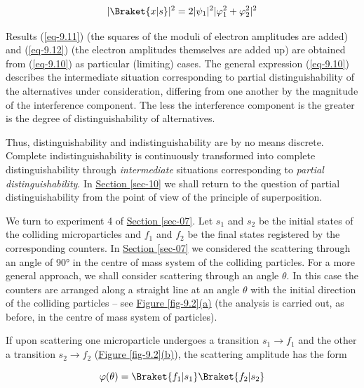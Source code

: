 \documentclass[a4paper,sfsidenotes,colorlinks=true]{tufte-book}
\numberwithin{equation}{section}
\numberwithin{figure}{section}
\begin{document}
\begin{equation}%
|\Braket{x|s}|^{2} = 2 |\psi_{1}|^{2} |\varphi_{1}^{2} + \varphi_{2}^{2}|^{2}
\label{eq-9.12}
\end{equation}

Results (\ref{eq-9.11}) (the squares of the moduli of electron amplitudes are added) and (\ref{eq-9.12}) (the electron amplitudes themselves are added up) are obtained from (\ref{eq-9.10}) as particular (limiting) cases. The general expression (\ref{eq-9.10}) describes the intermediate situation corresponding to partial distinguishability of the alternatives under consideration, differing from one another by the magnitude of the interference component. The less the interference component is the greater is the degree of distinguishability of alternatives.

Thus, distinguishability and indistinguishability are by no means
discrete. Complete indistinguishability is continuously transformed
into complete distinguishability through \emph{intermediate}
situations corresponding to \emph{partial distinguishability}. In
\hyperref[sec-10]{Section \ref{sec-10}} we shall return to the
question of partial distinguishability from the point of view of the
principle of superposition.


We  turn to experiment 4 of \hyperref[sec-07]{Section
  \ref{sec-07}}. Let $s_{1}$ and $s_{2}$ be the initial states of the
colliding microparticles and $f_{1}$ and $f_{2}$ be the final states
registered by the corresponding counters. In \hyperref[sec-07]{Section
  \ref{sec-07}} we considered the scattering through an angle of
\ang{90} in the centre of mass system of the colliding particles. For
a more general approach, we shall consider scattering through an angle
$\theta$. In this case the counters are arranged along a straight line
at an angle $\theta$ with the initial direction of the colliding
particles -- see \hyperref[fig-9.2]{Figure \ref{fig-9.2}(a)} (the analysis is carried out, as before, in the centre of mass system of particles).

If upon scattering one microparticle undergoes a transition $s_{1} \to
f_{1}$ and the other a transition $s_{2} \to f_{2}$
(\hyperref[fig-9.2]{Figure \ref{fig-9.2}(b)}), the scattering
amplitude has the form 

\begin{equation}%
\varphi (\theta) = \Braket{f_{1} | s_{1}} \Braket{f_{2} | s_{2}}
\label{eq-9.13}
\end{equation}
\end{document}
